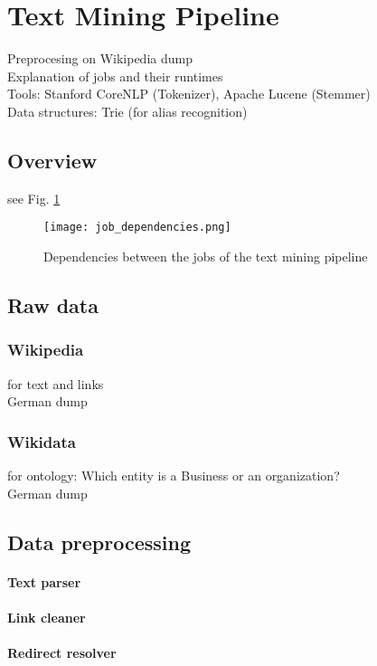 \section{Text Mining Pipeline}
Preprocesing on Wikipedia dump\\
Explanation of jobs and their runtimes\\
Tools: Stanford CoreNLP (Tokenizer), Apache Lucene (Stemmer)\\
Data structures: Trie (for alias recognition)\\

\subsection{Overview}
see Fig. \ref{fig:job_dependencies}
\begin{figure}[ht]
	\centering
  \texttt{[image: job\_dependencies.png]}
	\caption{Dependencies between the jobs of the text mining pipeline}
	\label{fig:job_dependencies}
\end{figure}

\subsection{Raw data}
\subsubsection{Wikipedia}
for text and links\\
German dump

\subsubsection{Wikidata}
for ontology: Which entity is a Business or an organization?\\
German dump

\subsection{Data preprocessing}

\paragraph{Text parser}
\paragraph{Link cleaner}
\paragraph{Redirect resolver}
